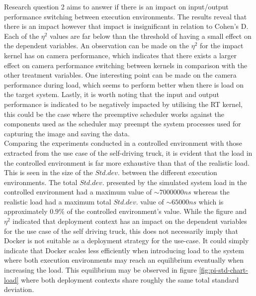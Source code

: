 Research question 2 aims to answer if there is an impact on input/output performance switching between execution environments. The results reveal that there is an impact however that impact is insignificant in relation to Cohen's D. Each of the $\eta^{2}$ values are far below than the threshold of having a small effect on the dependent variables. An observation can be made on the $\eta^{2}$ for the impact kernel has on camera performance, which indicates that there exists a larger effect on camera performance switching between kernels in comparison with the other treatment variables. One interesting point can be made on the camera performance during load, which seems to perform better when there is load on the target system. Lastly, it is worth noting that the input and output performance is indicated to be negatively impacted by utilising the RT kernel, this could be the case where the preemptive scheduler works against the components used as the scheduler may preempt the system processes used for capturing the image and saving the data.\\

Comparing the experiments conducted in a controlled environment with those extracted from the use case of the self-driving truck, it is evident that the load in the controlled environment is far more exhaustive than that of the realistic load. This is seen in the size of the $Std.dev.$ between the different execution environments. The total $Std.dev.$ presented by the simulated system load in the controlled environment had a maximum value of $\sim7000000ns$ whereas the realistic load had a maximum total $Std.dev.$ value of $\sim65000ns$ which is approximately $0.9\%$ of the controlled environment's value. While the figure and $\eta^{2}$ indicated that deployment context has an impact on the dependent variables for the use case of the self driving truck, this does not necessarily imply that Docker is not suitable as a deployment strategy for the use-case. It could simply indicate that Docker scales less efficiently when introducing load to the system where both execution environments may reach an equilibrium eventually when increasing the load. This equilibrium may be observed in figure \ref{fig:pi-std-chart-load} where both deployment contexts share roughly the same total standard deviation.\\

